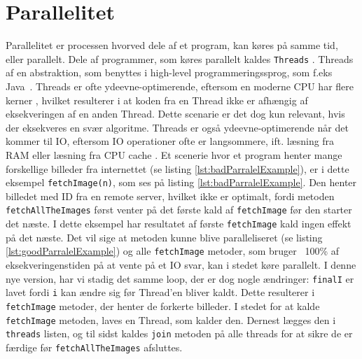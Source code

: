 \section{Parallelitet}\label{ch:parallelitet}
Parallelitet er processen hvorved dele af et program, kan køres på samme tid, eller parallelt. Dele af programmer, som køres parallelt kaldes \texttt{Threads} \cite{JavaThreads}. Threads af en abstraktion, som benyttes i high-level programmeringssprog, som f.eks Java~\cite{HighLevel}. Threads er ofte ydeevne-optimerende, eftersom en moderne CPU har flere kerner \cite{MultiCores}, hvilket resulterer i at koden fra en Thread ikke er afhængig af eksekveringen af en anden Thread. Dette scenarie er det dog kun relevant, hvis der eksekveres en svær algoritme. 
Threads er også ydeevne-optimerende når det kommer til IO, eftersom IO operationer ofte er langsommere, ift. læsning fra RAM eller læsning fra CPU cache \cite{OperatingSystems}. Et scenerie hvor et program henter mange forskellige billeder fra internettet (se listing \ref{lst:badParralelExample}), er i dette eksempel \texttt{fetchImage(n)}, som ses på listing \ref{lst:badParralelExample}. Den henter billedet med ID fra en remote server, hvilket ikke er optimalt, fordi metoden \texttt{fetchAllTheImages} først venter på det første kald af \texttt{fetchImage} før den starter det næste. I dette eksempel har resultatet af første \texttt{fetchImage} kald ingen effekt på det næste. Det vil sige at metoden kunne blive paralleliseret (se listing \ref{lst:goodParralelExample}) og alle \texttt{fetchImage} metoder, som bruger ~100\% af eksekveringenstiden på at vente på et IO svar, kan i stedet køre parallelt. I denne nye version, har vi stadig det samme loop, der er dog nogle ændringer: \texttt{finalI} er lavet fordi \texttt{i} kan ændre sig før Thread'en bliver kaldt. Dette resulterer i \texttt{fetchImage} metoder, der henter de forkerte billeder. I stedet for at kalde \texttt{fetchImage} metoden, laves en Thread, som kalder den. 
Dernest lægges den i \texttt{threads} listen, og til sidst kaldes \texttt{join} metoden på alle threads for at sikre de er færdige før \texttt{fetchAllTheImages} afsluttes.


